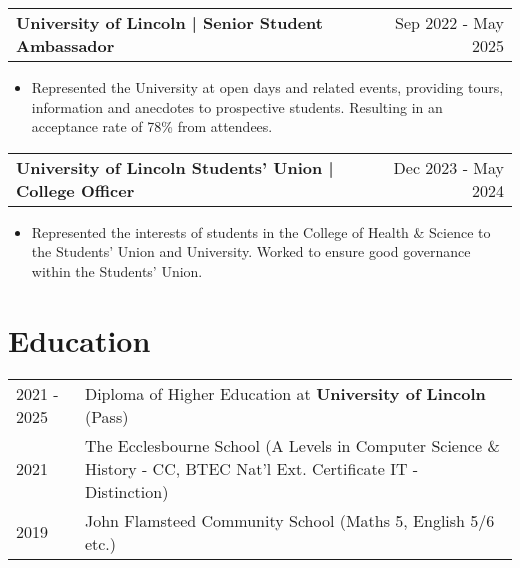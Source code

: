 \documentclass[a4paper,12pt]{article}
\makeatletter
\newenvironment{joblong}[2]
    {
    \begin{tabularx}{\linewidth}{@{}l X r@{}}
    \textbf{#1} & \hfill &  #2 \\[3.75pt]
    \end{tabularx}
    \begin{minipage}[t]{\linewidth}
    \begin{itemize}[nosep,after=\strut, leftmargin=1em, itemsep=3pt,label=--]
    }
    {
    \end{itemize}
    \end{minipage}    
    }
\makeatother
\begin{document}
\begin{joblong}{University of Lincoln | Senior Student Ambassador}{Sep 2022 - May 2025}
\item Represented the University at open days and related events, providing tours, information and anecdotes to prospective students. Resulting in an acceptance rate of 78\% from attendees.
\end{joblong}
\begin{joblong}{University of Lincoln Students' Union | College Officer}{Dec 2023 - May 2024}
\item Represented the interests of students in the College of Health \& Science to the Students' Union and University. Worked to ensure good governance within the Students' Union.
\end{joblong}


\section{Education}
\begin{tabularx}{\linewidth}{@{}l X@{}}	
2021 - 2025 & Diploma of Higher Education at \textbf{University of Lincoln} \hfill (Pass) \\ 

2021 & The Ecclesbourne School  (A Levels in Computer Science \& History - CC, BTEC Nat'l Ext. Certificate IT - Distinction) \\

2019 & John Flamsteed Community School \hfill  (Maths 5, English 5/6 etc.) \\
\end{tabularx}
\end{document}
